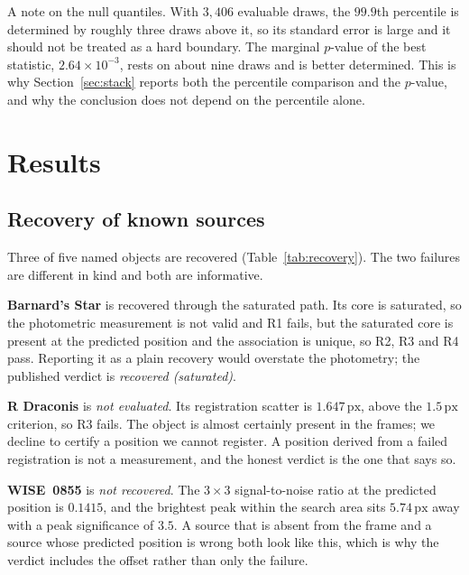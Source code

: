 \documentclass[11pt,a4paper]{article}
\newcommand{\unit}[1]{\,\mathrm{#1}}
\newcommand{\px}{\unit{px}}
\begin{document}
A note on the null quantiles. With $3{,}406$ evaluable draws, the $99.9$th
percentile is determined by roughly three draws above it, so its standard error is
large and it should not be treated as a hard boundary. The marginal $p$-value of
the best statistic, $2.64\times10^{-3}$, rests on about nine draws and is better
determined. This is why Section~\ref{sec:stack} reports both the percentile
comparison and the $p$-value, and why the conclusion does not depend on the
percentile alone.

\section{Results}\label{sec:results}

\subsection{Recovery of known sources}\label{sec:recovery}
Three of five named objects are recovered (Table~\ref{tab:recovery}). The two
failures are different in kind and both are informative.

\textbf{Barnard's Star} is recovered through the saturated path. Its core is
saturated, so the photometric measurement is not valid and R1 fails, but the
saturated core is present at the predicted position and the association is unique,
so R2, R3 and R4 pass. Reporting it as a plain recovery would overstate the
photometry; the published verdict is \emph{recovered (saturated)}.

\textbf{R Draconis} is \emph{not evaluated}. Its registration scatter is
$1.647\px$, above the $1.5\px$ criterion, so R3 fails. The object is almost
certainly present in the frames; we decline to certify a position we cannot
register. A position derived from a failed registration is not a measurement, and
the honest verdict is the one that says so.

\textbf{WISE~0855} is \emph{not recovered}. The $3\times3$ signal-to-noise ratio
at the predicted position is $0.1415$, and the brightest peak within the search
area sits $5.74\px$ away with a peak significance of $3.5$. A source that is
absent from the frame and a source whose predicted position is wrong both look
like this, which is why the verdict includes the offset rather than only the
failure.
\end{document}
